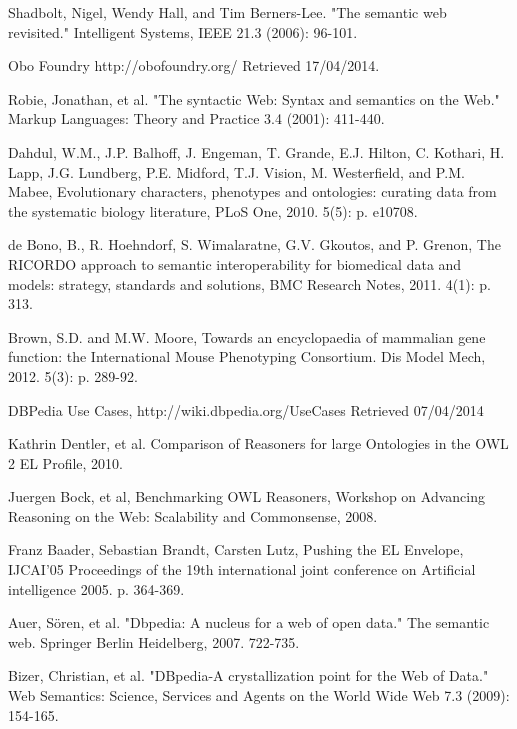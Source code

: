 \documentclass{article}
\begin{document}
\begin{thebibliography}{9}
  Shadbolt, Nigel, Wendy Hall, and Tim Berners-Lee. "The semantic web
  revisited." Intelligent Systems, IEEE 21.3 (2006): 96-101.

  Obo Foundry
  http://obofoundry.org/
  Retrieved 17/04/2014.

  Robie, Jonathan, et al. 
  "The syntactic Web: Syntax and semantics on the Web."
  Markup Languages: Theory and Practice 3.4 
  (2001): 411-440.

  Dahdul, W.M., J.P. Balhoff, J. Engeman, T. Grande, E.J. Hilton, C. Kothari, H. Lapp, J.G. Lundberg, P.E. Midford, T.J. Vision, M. Westerfield, and P.M. Mabee, 
  Evolutionary characters, phenotypes and ontologies: curating data from the systematic biology literature,
  PLoS One,
  2010. 5(5): p. e10708.

  de Bono, B., R. Hoehndorf, S. Wimalaratne, G.V. Gkoutos, and P. Grenon, 
  The RICORDO approach to semantic interoperability for biomedical data and models: strategy, standards
and solutions, 
  BMC Research Notes, 
  2011. 4(1): p. 313.

  Brown, S.D. and M.W. Moore,
  Towards an encyclopaedia of mammalian gene function: the International Mouse Phenotyping Consortium. 
  Dis Model Mech, 
  2012. 5(3): p. 289-92.

  DBPedia Use Cases,
  http://wiki.dbpedia.org/UseCases
  Retrieved 07/04/2014

  Kathrin Dentler, et al.
  Comparison of Reasoners for large Ontologies in the OWL 2 EL Profile,
  2010.

  Juergen Bock, et al,
  Benchmarking OWL Reasoners,
  Workshop on Advancing Reasoning on the Web: Scalability and Commonsense,
  2008.

  Franz Baader, Sebastian Brandt, Carsten Lutz,
  Pushing the EL Envelope,
  IJCAI'05 Proceedings of the 19th international joint conference on Artificial intelligence
  2005. p. 364-369.

  Auer, Sören, et al. "Dbpedia: A nucleus for a web of open data." The semantic
  web. Springer Berlin Heidelberg, 2007. 722-735.

  Bizer, Christian, et al. "DBpedia-A crystallization point for the Web of
  Data." Web Semantics: Science, Services and Agents on the World Wide Web 7.3
  (2009): 154-165.


\end{thebibliography}
\end{document}
